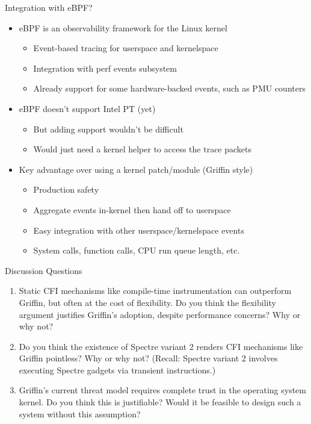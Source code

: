 \documentclass[12pt, dvipsnames, aspectratio=169]{beamer}
\begin{document}
\begin{frame}[c]{Integration with eBPF?}{}
  \begin{itemize}
    \item eBPF is an observability framework for the Linux kernel
    \begin{itemize}
      \item Event-based tracing for userspace and kernelspace
      \item Integration with perf events subsystem
      \item Already support for some hardware-backed events, such as PMU counters
    \end{itemize}

    \vfill
    \item eBPF doesn't support Intel PT (yet)
    \begin{itemize}
      \item But adding support wouldn't be difficult
      \item Would just need a kernel helper to access the trace packets
    \end{itemize}

    \vfill
    \item Key advantage over using a kernel patch/module (Griffin style)
    \begin{itemize}
      \item Production safety
      \item Aggregate events in-kernel then hand off to userspace
      \item Easy integration with other userspace/kernelspace events
      \item System calls, function calls, CPU run queue length, etc.
    \end{itemize}
  \end{itemize}
\end{frame}

\begin{frame}[c]{Discussion Questions}{}
  \begin{enumerate}
    \item Static CFI mechanisms like compile-time instrumentation can outperform Griffin, but often at the cost of flexibility. Do you think the flexibility argument justifies Griffin's adoption, despite performance concerns? Why or why not?

    \vfill
    \item Do you think the existence of Spectre variant 2 renders CFI mechanisms like Griffin pointless? Why or why not? (Recall: Spectre variant 2 involves executing Spectre gadgets via transient instructions.)

    \vfill
    \item Griffin's current threat model requires complete trust in the operating system kernel. Do you think this is justifiable? Would it be feasible to design such a system without this assumption?
  \end{enumerate}
\end{frame}
\end{document}
